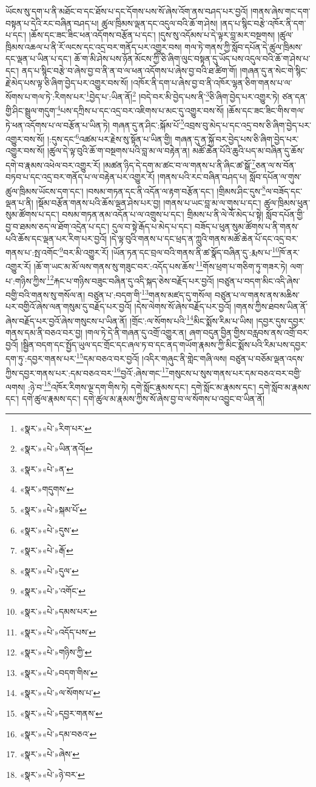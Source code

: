 ཡོངས་སུ་དག་པ་ནི་མཐོང་བ་དང་ཐོས་པ་དང་དོགས་པས་སོ་ཞེས་འོག་ནས་བཤད་པར་བྱའོ། །གནས་ཞེས་གང་དག་བསྟན་པ་དེའི་རང་བཞིན་བཤད་པ། ཚུལ་ཁྲིམས་ལྡན་དང་འདུལ་བའི་ཆོ་ག་ཤེས། །ནད་པ་སྙིང་བརྩེ་འཁོར་ནི་དག་པ་དང་། །ཆོས་དང་ཟང་ཟིང་ཕན་འདོགས་བརྩོན་པ་དང་། །དུས་སུ་འདོམས་པ་དེ་ལྟར་བླ་མར་བསྔགས། །ཚུལ་ཁྲིམས་འཆལ་པ་ནི་རོ་ལངས་དང་འདྲ་བར་གནོད་པར་འགྱུར་བས། གལ་ཏེ་གནས་ཀྱི་སློབ་དཔོན་དེ་ཚུལ་ཁྲིམས་དང་ལྡན་པ་ཡིན་པ་དང་། ཆོ་ག་མི་ཤེས་པས་ཉོན་མོངས་ཀྱི་ཅི་ཞིག་ལུང་བསྟན་དུ་ཡོད་པས་འདུལ་བའི་ཆོ་ག་ཤེས་པ་དང་། ནད་པ་སྙིང་བརྩེ་བ་ཞེས་བྱ་བ་ནི་ན་བ་ལ་ཕན་འདོགས་པ་ཞེས་བྱ་བའི་ཐ་ཚིག་གོ། །གཞན་དུ་ན་སེང་གེ་སྙིང་རྗེ་མེད་པས་ལྟ་ཅི་ཞིག་བྱེད་པར་འགྱུར་བས་སོ། །འཁོར་ནི་དག་པ་ཞེས་བྱ་བ་ནི་འཁོར་ལྷན་ཅིག་གནས་པ་ལ་སོགས་པ་གལ་ཏེ་:རིགས་པར་\footnote{«སྣར་»«པེ་»རིག་པར་}བྱེད་པ་:ཡིན་ནོ།\footnote{«སྣར་»«པེ་»ཡིན་ནའོ།} །བདེ་བར་མི་བྱེད་པས་ནི་\footnote{«སྣར་»«པེ་»ན་}ཅི་ཞིག་བྱེད་པར་འགྱུར་ཏེ། ཙན་དན་གྱི་ཤིང་སྦྲུལ་གདུག་\footnote{«སྣར་»གདུགས་}པས་དཀྲིས་པ་དང་འདྲ་བར་འཇིགས་པ་མང་དུ་འགྱུར་བས་སོ། །ཆོས་དང་ཟང་ཟིང་གིས་གལ་ཏེ་ཕན་འདོགས་པ་ལ་བརྩོན་པ་ཡིན་ཏེ། གཞན་དུ་ན་ཤིང་:སྐོམ་པོ་\footnote{«སྣར་»«པེ་»སྐམ་པོ་}འབྲས་བུ་མེད་པ་དང་འདྲ་བས་ཅི་ཞིག་བྱེད་པར་འགྱུར་བས་སོ། །:དུས་དང་\footnote{«སྣར་»«པེ་»དུས་}འཚམ་པར་རྗེས་སུ་སྟོན་པ་ཡིན་གྱི། གཞན་དུ་ན་སྐྱོ་བར་བྱེད་པས་ཅི་ཞིག་བྱེད་པར་འགྱུར་བས་སོ། །ཚུལ་དེ་ལྟ་བུའི་ཆོ་ག་བསྔགས་པའི་བླ་མ་ལ་བརྟེན་ན། མཚོ་ཆེན་པོའི་ཆུའི་པད་མ་བཞིན་དུ་ཆོས་དགེ་བ་རྣམས་འཕེལ་བར་འགྱུར་རོ། །མཚན་ཉིད་དེ་དག་མ་ཚང་བ་ལ་གནས་པ་ནི་ཞིང་ཚ་སྒོ་\footnote{«སྣར་»«པེ་»རྒོ་}ཅན་ལ་ས་བོན་བཏབ་པ་དང་འདྲ་བར་གནོད་པ་ལ་བརྟེན་པར་འགྱུར་རོ། །གནས་པའི་རང་བཞིན་བཤད་པ། སློབ་དཔོན་ལ་གུས་ཚུལ་ཁྲིམས་ཡོངས་དག་དང་། །བསམ་གཏན་དང་ནི་འདོན་ལ་རྟག་བརྩོན་དང་། །གྲིམས་ཤིང་དུས་\footnote{«སྣར་»«པེ་»དུལ་}ལ་བཟོད་དང་ལྡན་པ་ནི། །སྡོམ་བརྩོན་གནས་པའི་ཆོས་ལྡན་ཤེས་པར་བྱ། །གནས་པ་ཡང་བླ་མ་ལ་གུས་པ་དང་། ཚུལ་ཁྲིམས་ཕུན་སུམ་ཚོགས་པ་དང་། བསམ་གཏན་ནམ་འདོན་པ་ལ་འགྲུས་པ་དང་། གྲིམས་པ་ནི་ལེ་ལོ་མེད་པ་སྟེ། སློབ་དཔོན་གྱི་བྱ་བ་ཐམས་ཅད་ལ་ཐོག་འདྲེན་པ་དང་། དུལ་བ་སྟེ་རྒོད་པ་མེད་པ་དང་། བཟོད་པ་ཕུན་སུམ་ཚོགས་པ་ནི་གནས་པའི་ཆོས་དང་ལྡན་པར་རིག་པར་བྱའོ། །དེ་ལྟ་བུའི་གནས་པ་དང་ཕྲད་ན་ཀླུའི་གནས་མཚོ་ཆེན་པོ་དང་འདྲ་བར་གནས་པ་:སྤ་འགོང་\footnote{«སྣར་»«པེ་»་འགོང་}བར་མི་འགྱུར་རོ། །ཡོན་ཏན་དང་བྲལ་བའི་གནས་ནི་ཚ་སྣོད་བཞིན་དུ་:རྨས་པ་\footnote{«སྣར་»«པེ་»དམས་པར་}ཁོ་ནར་འགྱུར་རོ། །ཆོ་ག་ཡང་མ་མོ་ལས་གནས་སུ་གཟུང་བར་:འདོད་པས་ཆོས་\footnote{«སྣར་»«པེ་»འདོད་པས་}གོས་ཕྲག་པ་གཅིག་ཏུ་གཟར་ཏེ། ལག་པ་:གཉིས་ཀྱིས་\footnote{«སྣར་»«པེ་»གཉིས་ཀྱི་}རྐང་པ་གཉིས་བཟུང་བཞིན་དུ་འདི་སྐད་ཅེས་བརྗོད་པར་བྱའོ། །བཙུན་པ་བདག་མིང་འདི་ཞེས་བགྱི་བའི་གནས་སུ་གསོལ་ན། བཙུན་པ་:བདག་གི་\footnote{«སྣར་»«པེ་»བདག་གིས་}གནས་མཛད་དུ་གསོལ། བཙུན་པ་ལ་གནས་ནས་མཆིས་པར་བགྱིའོ་ཞེས་ལན་གསུམ་དུ་བརྗོད་པར་བྱའོ། །དེས་ལེགས་སོ་ཞེས་བརྗོད་པར་བྱའོ། །གནས་ཀྱིས་ཐབས་ཡིན་ནོ་ཞེས་བརྗོད་པར་བྱའོ་ཞེས་གསུངས་པ་ཡིན་ནོ། །གྲོང་:ལ་སོགས་པའི་\footnote{«སྣར་»«པེ་»ལ་སོགས་པ་}མིང་སྨོས་རིམ་པ་ཡིས། །དབྱར་དུས་དབྱར་གནས་དམ་ནི་བཅའ་བར་བྱ། །གལ་ཏེ་དེ་ནི་གཞན་དུ་འགྲོ་འགྱུར་ན། ཞག་བདུན་བྱིན་གྱིས་བརླབས་ནས་འགྲོ་བར་བྱའོ། །སྦྱིན་བདག་དང་སྤྱོད་ཡུལ་དང་གྲོང་དང་ཞལ་ཏ་བ་དང་ནད་གཡོག་རྣམས་ཀྱི་མིང་སྨོས་པའི་རིམ་པས་དབྱར་དག་ཏུ་:དབྱར་གནས་པར་\footnote{«སྣར་»«པེ་»དབྱར་གནས་}དམ་བཅའ་བར་བྱའོ། །འདིར་གཞུང་ནི་གླེང་གཞི་ལས། བཙུན་པ་བཅོམ་ལྡན་འདས་ཀྱིས་དབྱར་གནས་པར་:དམ་བཅའ་བར་\footnote{«སྣར་»«པེ་»དམ་བཅའ་}བྱའོ་:ཞེས་གང་\footnote{«སྣར་»«པེ་»ཞེས་}གསུངས་པ་སུས་གནས་པར་དམ་བཅའ་བར་བགྱི་ལགས། :ཉེ་བ་\footnote{«སྣར་»«པེ་»ཉེ་བར་}འཁོར་རིགས་ལྔ་དག་གིས་ཏེ། དགེ་སློང་རྣམས་དང་། དགེ་སློང་མ་རྣམས་དང་། དགེ་སློབ་མ་རྣམས་དང་། དགེ་ཚུལ་རྣམས་དང་། དགེ་ཚུལ་མ་རྣམས་ཀྱིས་སོ་ཞེས་བྱ་བ་ལ་སོགས་པ་འབྱུང་བ་ཡིན་ནོ། 